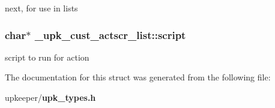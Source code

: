 next, for use in lists 
\subsubsection{\setlength{\rightskip}{0pt plus 5cm}char$\ast$ \bf{\_\-upk\_\-cust\_\-actscr\_\-list::script}}\label{struct__upk__cust__actscr__list_f1718ec154011cbad78822b32ba36a62}


script to run for action 

The documentation for this struct was generated from the following file:\begin{CompactItemize}
\item 
upkeeper/\bf{upk\_\-types.h}\end{CompactItemize}

